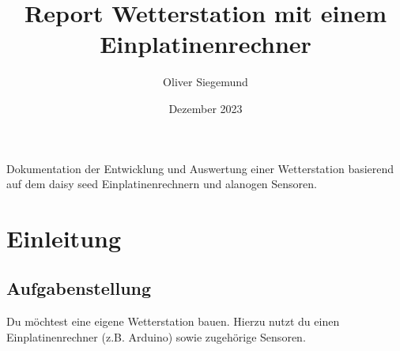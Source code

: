 \documentclass{article}
\title{Report Wetterstation mit einem Einplatinenrechner}
\author{Oliver Siegemund}
\date{Dezember 2023}
\begin{document}
\maketitle
Dokumentation der Entwicklung und Auswertung einer Wetterstation basierend auf dem daisy seed Einplatinenrechnern und alanogen Sensoren.
\pagebreak
\tableofcontents
\pagebreak
\section{Einleitung}
\label{sec:title}
\subsection{Aufgabenstellung \cite{aufgabenstellung}}
\label{ssec:subtitle}
Du möchtest eine eigene Wetterstation bauen. Hierzu nutzt du einen Einplatinenrechner (z.B. Arduino) sowie zugehörige Sensoren.
\end{document}
